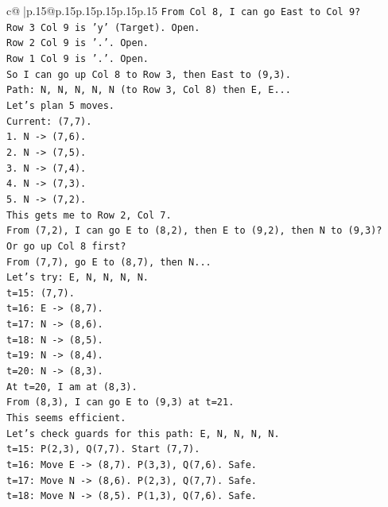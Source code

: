 \documentclass{article}
\begin{document}
{\begin{supertabular}{c@{$\;$}|p{.15\linewidth}@{}p{.15\linewidth}p{.15\linewidth}p{.15\linewidth}p{.15\linewidth}p{.15\linewidth}}
{{{\texttt{From Col 8, I can go East to Col 9?} \\
\texttt{Row 3 Col 9 is 'y' (Target). Open.} \\
\texttt{Row 2 Col 9 is '.'. Open.} \\
\texttt{Row 1 Col 9 is '.'. Open.} \\
\texttt{So I can go up Col 8 to Row 3, then East to (9,3).} \\
\texttt{Path: N, N, N, N, N (to Row 3, Col 8) then E, E...} \\
\texttt{Let's plan 5 moves.} \\
\texttt{Current: (7,7).} \\
\texttt{1. N {-}> (7,6).} \\
\texttt{2. N {-}> (7,5).} \\
\texttt{3. N {-}> (7,4).} \\
\texttt{4. N {-}> (7,3).} \\
\texttt{5. N {-}> (7,2).} \\
\texttt{This gets me to Row 2, Col 7.} \\
\texttt{From (7,2), I can go E to (8,2), then E to (9,2), then N to (9,3)?} \\
\texttt{Or go up Col 8 first?} \\
\texttt{From (7,7), go E to (8,7), then N...} \\
\texttt{Let's try: E, N, N, N, N.} \\
\texttt{t=15: (7,7).} \\
\texttt{t=16: E {-}> (8,7).} \\
\texttt{t=17: N {-}> (8,6).} \\
\texttt{t=18: N {-}> (8,5).} \\
\texttt{t=19: N {-}> (8,4).} \\
\texttt{t=20: N {-}> (8,3).} \\
\texttt{At t=20, I am at (8,3).} \\
\texttt{From (8,3), I can go E to (9,3) at t=21.} \\
\texttt{This seems efficient.} \\
\texttt{Let's check guards for this path: E, N, N, N, N.} \\
\texttt{t=15: P(2,3), Q(7,7). Start (7,7).} \\
\texttt{t=16: Move E {-}> (8,7). P(3,3), Q(7,6). Safe.} \\
\texttt{t=17: Move N {-}> (8,6). P(2,3), Q(7,7). Safe.} \\
\texttt{t=18: Move N {-}> (8,5). P(1,3), Q(7,6). Safe.} \\
}}}
\end{supertabular}}
\end{document}

